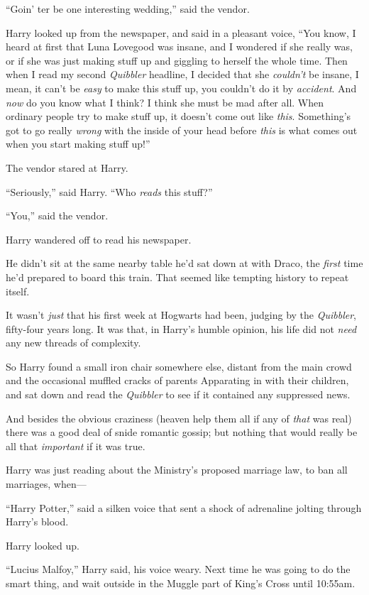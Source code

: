 ``Goin' ter be one interesting wedding,'' said the vendor.

Harry looked up from the newspaper, and said in a pleasant voice, ``You
know, I heard at first that Luna Lovegood was insane, and I wondered if
she really was, or if she was just making stuff up and giggling to
herself the whole time. Then when I read my second \emph{Quibbler}
headline, I decided that she \emph{couldn't} be insane, I mean, it can't
be \emph{easy} to make this stuff up, you couldn't do it by
\emph{accident}. And \emph{now} do you know what I think? I think she
must be mad after all. When ordinary people try to make stuff up, it
doesn't come out like \emph{this}. Something's got to go really
\emph{wrong} with the inside of your head before \emph{this} is what
comes out when you start making stuff up!''

The vendor stared at Harry.

``Seriously,'' said Harry. ``Who \emph{reads} this stuff?''

``You,'' said the vendor.

Harry wandered off to read his newspaper.

He didn't sit at the same nearby table he'd sat down at with Draco, the
\emph{first} time he'd prepared to board this train. That seemed like
tempting history to repeat itself.

It wasn't \emph{just} that his first week at Hogwarts had been, judging
by the \emph{Quibbler}, fifty-four years long. It was that, in Harry's
humble opinion, his life did not \emph{need} any new threads of
complexity.

So Harry found a small iron chair somewhere else, distant from the main
crowd and the occasional muffled cracks of parents Apparating in with
their children, and sat down and read the \emph{Quibbler} to see if it
contained any suppressed news.

And besides the obvious craziness (heaven help them all if any of
\emph{that} was real) there was a good deal of snide romantic gossip;
but nothing that would really be all that \emph{important} if it was
true.

Harry was just reading about the Ministry's proposed marriage law, to
ban all marriages, when---

``Harry Potter,'' said a silken voice that sent a shock of adrenaline
jolting through Harry's blood.

Harry looked up.

``Lucius Malfoy,'' Harry said, his voice weary. Next time he was going
to do the smart thing, and wait outside in the Muggle part of King's
Cross until 10:55am.

